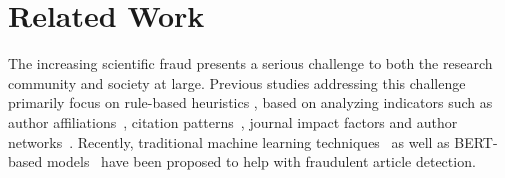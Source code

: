 \section{Related Work}
The increasing scientific fraud presents a serious challenge to both the research community and society at large. Previous studies addressing this challenge primarily focus on rule-based heuristics%
, based on analyzing indicators such as author affiliations~\cite{sabel2023fake}, citation patterns~\cite{shepperd2023analysis,feng2024citation}, journal impact factors and author networks~\cite{perez2022threats}. 
Recently, traditional machine learning techniques~\cite{dadkhah2023detection, cabanac2022problematic} as well as BERT-based models~\cite{freedman2024detecting} have been proposed to help with fraudulent article detection. 


